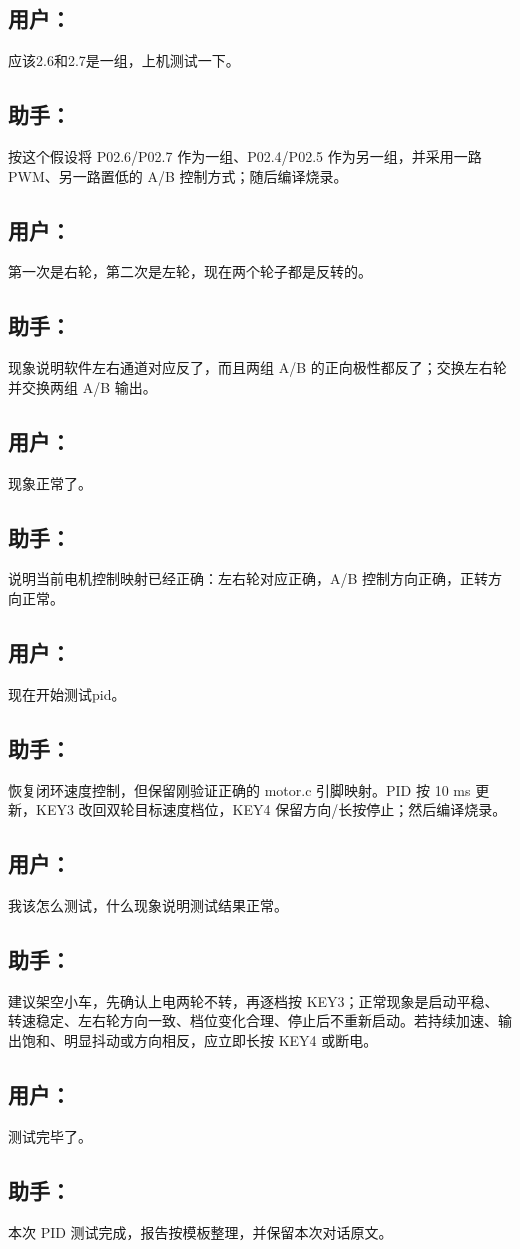 \documentclass[11pt,a4paper,fontset=fandol]{ctexart}
\begin{document}
\subsection*{用户：}
应该2.6和2.7是一组，上机测试一下。

\subsection*{助手：}
按这个假设将 P02.6/P02.7 作为一组、P02.4/P02.5 作为另一组，并采用一路 PWM、另一路置低的 A/B 控制方式；随后编译烧录。

\subsection*{用户：}
第一次是右轮，第二次是左轮，现在两个轮子都是反转的。

\subsection*{助手：}
现象说明软件左右通道对应反了，而且两组 A/B 的正向极性都反了；交换左右轮并交换两组 A/B 输出。

\subsection*{用户：}
现象正常了。

\subsection*{助手：}
说明当前电机控制映射已经正确：左右轮对应正确，A/B 控制方向正确，正转方向正常。

\subsection*{用户：}
现在开始测试pid。

\subsection*{助手：}
恢复闭环速度控制，但保留刚验证正确的 motor.c 引脚映射。PID 按 10 ms 更新，KEY3 改回双轮目标速度档位，KEY4 保留方向/长按停止；然后编译烧录。

\subsection*{用户：}
我该怎么测试，什么现象说明测试结果正常。

\subsection*{助手：}
建议架空小车，先确认上电两轮不转，再逐档按 KEY3；正常现象是启动平稳、转速稳定、左右轮方向一致、档位变化合理、停止后不重新启动。若持续加速、输出饱和、明显抖动或方向相反，应立即长按 KEY4 或断电。

\subsection*{用户：}
测试完毕了。

\subsection*{助手：}
本次 PID 测试完成，报告按模板整理，并保留本次对话原文。
\end{document}
